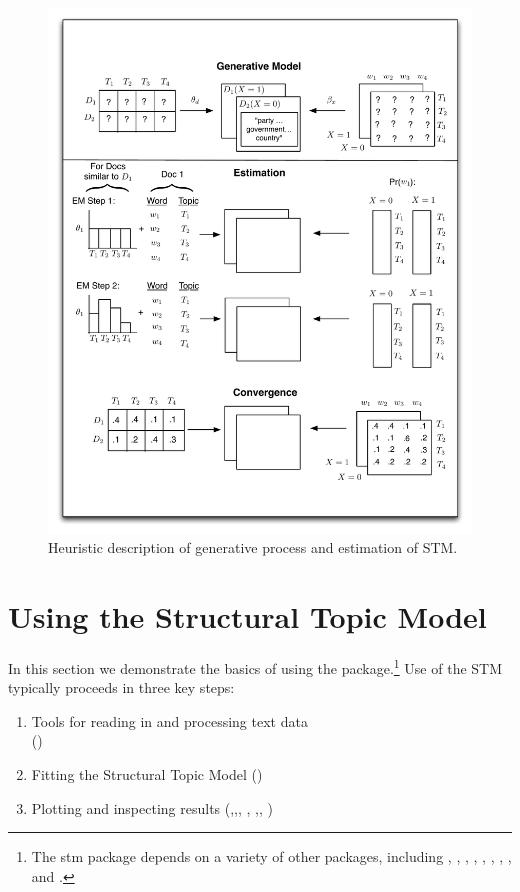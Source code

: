 \documentclass[nojss]{jss}
\begin{document}
\begin{figure}[h!]
  \centering
  \includegraphics[scale=.45]{STMdiagram.pdf}
  \caption{Heuristic description of generative process and estimation of STM.}\label{fig:stmoverview}
\end{figure}

\section{Using the Structural Topic Model}

In this section we demonstrate the basics of using the package.\footnote{The stm package depends on a variety of other packages, including  \citep{MatrixStats},  \citep{slam},  \citep{lda},  \citep{stringr},  \citep{SnowballC},  \citep{meyer2008text},  \citep{igraph},  \citep{huge}, and  \citep{friedman2010regularization}.} Use of the STM typically proceeds in three key steps:

\begin{enumerate}
\item Tools for reading in and processing text data \\
()
\item Fitting the Structural Topic Model
()
\item Plotting and inspecting results
(,,, , ,, )
\end{enumerate}
\end{document}
